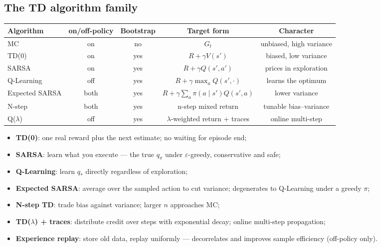 \documentclass{article}
\begin{document}
\subsection*{The TD algorithm family}

\begin{center}
\begin{tabular}{lcccc}
\toprule
Algorithm & on/off-policy & Bootstrap & Target form & Character \\
\midrule
MC & on & no & $G_t$ & unbiased, high variance \\
TD(0) & on & yes & $R+\gamma V(s')$ & biased, low variance \\
SARSA & on & yes & $R+\gamma Q(s',a')$ & prices in exploration \\
Q-Learning & off & yes & $R+\gamma\max_a Q(s',\cdot)$ & learns the optimum \\
Expected SARSA & both & yes & $R+\gamma\sum_a\pi(a\mid s')Q(s',a)$ & lower variance \\
N-step & both & yes & n-step mixed return & tunable bias--variance \\
Q($\lambda$) & off & yes & $\lambda$-weighted return + traces & online multi-step \\
\bottomrule
\end{tabular}
\end{center}

\begin{itemize}
  \item \textbf{TD(0)}: one real reward plus the next estimate; no waiting for episode end;
  \item \textbf{SARSA}: learn what you execute --- the true $q_\pi$ under $\varepsilon$-greedy, conservative and safe;
  \item \textbf{Q-Learning}: learn $q_*$ directly regardless of exploration;
  \item \textbf{Expected SARSA}: average over the sampled action to cut variance; degenerates to Q-Learning under a greedy $\pi$;
  \item \textbf{N-step TD}: trade bias against variance; larger $n$ approaches MC;
  \item \textbf{TD($\lambda$) + traces}: distribute credit over steps with exponential decay; online multi-step propagation;
  \item \textbf{Experience replay}: store old data, replay uniformly --- decorrelates and improves sample efficiency (off-policy only).
\end{itemize}
\end{document}
